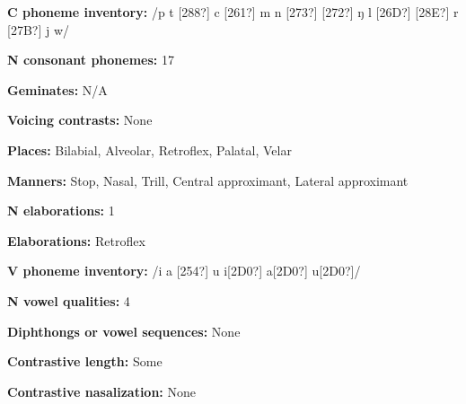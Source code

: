 \begin{styleBody}
\textbf{C phoneme inventory:} /p t [288?] c [261?] m n [273?] [272?] ŋ l [26D?] [28E?] r [27B?] j w/
\end{styleBody}

\begin{styleBody}
\textbf{N consonant phonemes:} 17
\end{styleBody}

\begin{styleBody}
\textbf{Geminates:} N/A
\end{styleBody}

\begin{styleBody}
\textbf{Voicing contrasts:} None
\end{styleBody}

\begin{styleBody}
\textbf{Places:} Bilabial, Alveolar, Retroflex, Palatal, Velar
\end{styleBody}

\begin{styleBody}
\textbf{Manners:} Stop, Nasal, Trill, Central approximant, Lateral approximant
\end{styleBody}

\begin{styleBody}
\textbf{N elaborations:} 1
\end{styleBody}

\begin{styleBody}
\textbf{Elaborations:} Retroflex
\end{styleBody}

\begin{styleBody}
\textbf{V phoneme inventory:} /i a [254?] u i[2D0?] a[2D0?] u[2D0?]/
\end{styleBody}

\begin{styleBody}
\textbf{N vowel qualities:} 4
\end{styleBody}

\begin{styleBody}
\textbf{Diphthongs or vowel sequences:} None
\end{styleBody}

\begin{styleBody}
\textbf{Contrastive length:} Some
\end{styleBody}

\begin{styleBody}
\textbf{Contrastive nasalization:} None
\end{styleBody}

